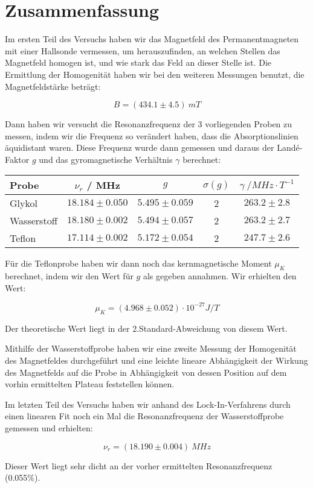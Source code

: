 \clearpage
\section{Zusammenfassung}

Im ersten Teil des Versuchs haben wir das Magnetfeld des Permanentmagneten mit einer Hallsonde vermessen, um herauszufinden, an welchen Stellen das Magnetfeld homogen ist, und wie stark das Feld an dieser Stelle ist. Die Ermittlung der Homogenität haben wir bei den weiteren Messungen benutzt, die Magnetfeldstärke beträgt:

$$ \boxed{B = (434.1 \pm 4.5)\ mT} $$

Dann haben wir versucht die Resonanzfrequenz der 3 vorliegenden Proben zu messen, indem wir die Frequenz so verändert haben, dass die Absorptionslinien äquidistant waren. Diese Frequenz wurde dann gemessen und daraus der Landé-Faktor $g$ und das gyromagnetische Verhältnis $\gamma$ berechnet:


\begin{center}
\begin{tabular}{| l | c | c | c | c |} \hline
Probe & $\nu_r$ / MHz & $g$ & $\sigma(g)$ & $\gamma\ / MHz\cdot T^{-1}$\\ \hline
Glykol & $18.184 \pm 0.050$ & $5.495 \pm 0.059$ & 2 & $263.2 \pm 2.8$ \\
Wasserstoff &$18.180 \pm 0.002$ & $ 5.494 \pm 0.057 $ & 2 & $263.2 \pm 2.7$ \\
Teflon & $17.114 \pm 0.002$ &  $5.172 \pm 0.054$ & 2 & $247.7 \pm 2.6$\\ \hline
\end{tabular}
\end{center}

Für die Teflonprobe haben wir dann noch das kernmagnetische Moment $\mu_K$ berechnet, indem wir den Wert für $g$ als gegeben annahmen. Wir erhielten den Wert:

$$\boxed{\mu_K = (4.968 \pm 0.052)\cdot 10^{-27} J/T} $$

Der theoretische Wert liegt in der 2.Standard-Abweichung von diesem Wert.

Mithilfe der Wasserstoffprobe haben wir eine zweite Messung der Homogenität des Magnetfeldes durchgeführt und eine leichte lineare Abhängigkeit der Wirkung des Magnetfelds auf die Probe in Abhängigkeit von dessen Position auf dem vorhin ermittelten Plateau feststellen können.

Im letzten Teil des Versuchs haben wir anhand des Lock-In-Verfahrens durch einen linearen Fit noch ein Mal die Resonanzfrequenz der Wasserstoffprobe gemessen und erhielten:

$$\boxed{\nu_r = (18.190 \pm 0.004)\ MHz}$$

Dieser Wert liegt sehr dicht an der vorher ermittelten Resonanzfrequenz (0.055\%).